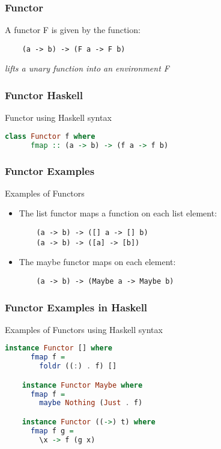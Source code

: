 \begin{frame}[fragile]
\frametitle{Functor}
\begin{block}{A functor F is given by the function:}
\begin{lstlisting}
    (a -> b) -> (F a -> F b)
\end{lstlisting}
\end{block}
\emph{lifts a unary function into an environment F}
\end{frame}

\begin{frame}[fragile]
\frametitle{Functor Haskell}
\begin{block}{Functor using Haskell syntax}
\begin{lstlisting}[language=haskell]
    class Functor f where
      fmap :: (a -> b) -> (f a -> f b)
\end{lstlisting}
\end{block}
\end{frame}

\begin{frame}[fragile]
\frametitle{Functor Examples}
\begin{block}{Examples of Functors}
\begin{itemize}
  \item The list functor maps a function on each list element:
    \begin{lstlisting}
    (a -> b) -> ([] a -> [] b)
    (a -> b) -> ([a] -> [b])
    \end{lstlisting}
  \item The maybe functor maps on each element:
    \begin{lstlisting}
    (a -> b) -> (Maybe a -> Maybe b)
    \end{lstlisting}    
\end{itemize}
\end{block}
\end{frame}

\begin{frame}[fragile]
\frametitle{Functor Examples in Haskell}
\begin{block}{Examples of Functors using Haskell syntax}
\begin{lstlisting}[language=haskell]
    instance Functor [] where
      fmap f =
        foldr ((:) . f) []

    instance Functor Maybe where
      fmap f =
        maybe Nothing (Just . f)

    instance Functor ((->) t) where
      fmap f g =
        \x -> f (g x)
\end{lstlisting}
\end{block}
\end{frame}
